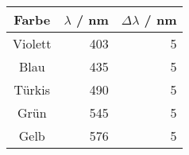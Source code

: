 \begin{tabular}{c|rr}
Farbe & $\lambda$ / nm  & $\Delta\lambda$ / nm \\
\hline
Violett & 403 & 5\\
Blau & 435 & 5\\
Türkis & 490 & 5\\
Grün & 545 & 5\\
Gelb & 576 & 5
\end{tabular}